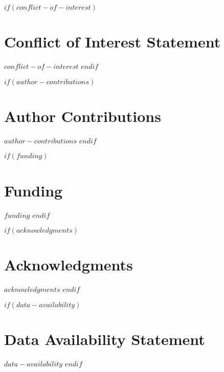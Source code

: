 $if(conflict-of-interest)$
\section*{Conflict of Interest Statement}
$conflict-of-interest$
$endif$

$if(author-contributions)$
\section*{Author Contributions}
$author-contributions$
$endif$

$if(funding)$
\section*{Funding}
$funding$
$endif$

$if(acknowledgments)$
\section*{Acknowledgments}
$acknowledgments$
$endif$

$if(data-availability)$
\section*{Data Availability Statement}
$data-availability$
$endif$